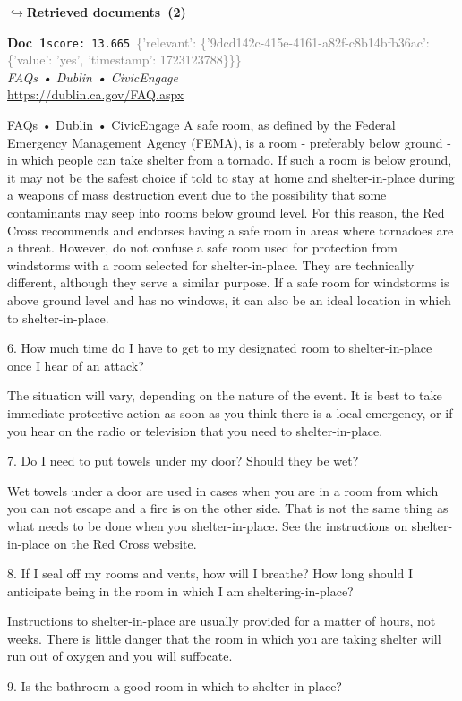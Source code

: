 \documentclass[a4paper,11pt]{article}
\begin{document}
\noindent\hfill{\footnotesize\textcolor{doccolor}{\textbf{$\hookrightarrow$\enspace Retrieved documents~(2)}}}
\begin{docenv}
{\footnotesize\textcolor{doccolor}{\textbf{Doc~1}}}\hfill{\tiny\texttt{score:~13.665}}\ {\tiny\textcolor{gray}{\{'relevant': \{'9dcd142c-415e-4161-a82f-c8b14bfb36ac': \{'value': 'yes', 'timestamp': 1723123788\}\}\}}}\\[3pt]
{\small\textit{FAQs • Dublin • CivicEngage}}\\[2pt]
{\tiny\url{https://dublin.ca.gov/FAQ.aspx}}\\[4pt]
{\footnotesize FAQs • Dublin • CivicEngage
A safe room, as defined by the Federal Emergency Management Agency (FEMA), is a room - preferably below ground - in which people can take shelter from a tornado. If such a room is below ground, it may not be the safest choice if told to stay at home and shelter-in-place during a weapons of mass destruction event due to the possibility that some contaminants may seep into rooms below ground level. For this reason, the Red Cross recommends and endorses having a safe room in areas where tornadoes are a threat. However, do not confuse a safe room used for protection from windstorms with a room selected for shelter-in-place. They are technically different, although they serve a similar purpose. If a safe room for windstorms is above ground level and has no windows, it can also be an ideal location in which to shelter-in-place.	

6.
How much time do I have to get to my designated room to shelter-in-place once I hear of an attack?

The situation will vary, depending on the nature of the event. It is best to take immediate protective action as soon as you think there is a local emergency, or if you hear on the radio or television that you need to shelter-in-place.	

7.
Do I need to put towels under my door? Should they be wet?

Wet towels under a door are used in cases when you are in a room from which you can not escape and a fire is on the other side. That is not the same thing as what needs to be done when you shelter-in-place. See the instructions on shelter-in-place on the Red Cross website.	

8.
If I seal off my rooms and vents, how will I breathe? How long should I anticipate being in the room in which I am sheltering-in-place?

Instructions to shelter-in-place are usually provided for a matter of hours, not weeks. There is little danger that the room in which you are taking shelter will run out of oxygen and you will suffocate.	

9.
Is the bathroom a good room in which to shelter-in-place?}
\end{docenv}
\end{document}
